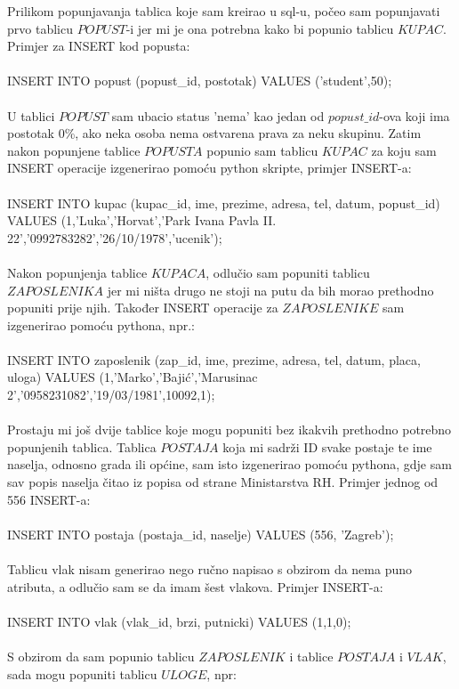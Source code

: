 \documentclass{OM_style}
\begin{document}
Prilikom popunjavanja tablica koje sam kreirao u sql-u, počeo sam popunjavati prvo tablicu $POPUST$-i jer mi je ona potrebna kako bi popunio tablicu $KUPAC$. Primjer za INSERT kod popusta: \\
\\
INSERT INTO popust (popust\_id, postotak) VALUES ('student',50); \\
\\
U tablici $POPUST$ sam ubacio status 'nema' kao jedan od $popust\_id$-ova koji ima postotak 0\%, ako neka osoba nema ostvarena prava za neku skupinu. Zatim nakon popunjene tablice $POPUSTA$ popunio sam tablicu $KUPAC$ za koju sam INSERT operacije izgenerirao pomoću python skripte, primjer INSERT-a:\\
\\
INSERT INTO kupac (kupac\_id, ime, prezime, adresa, tel, datum, popust\_id) VALUES (1,'Luka','Horvat','Park Ivana Pavla II. 22','0992783282','26/10/1978','ucenik'); \\
\\
Nakon popunjenja tablice $KUPACA$, odlučio sam popuniti tablicu $ZAPOSLENIKA$ jer mi ništa drugo ne stoji na putu da bih morao prethodno popuniti prije njih. Također INSERT operacije za $ZAPOSLENIKE$ sam izgenerirao pomoću pythona, npr.:\\
\\
INSERT INTO zaposlenik (zap\_id, ime, prezime, adresa, tel, datum, placa, uloga) VALUES (1,'Marko','Bajić','Marusinac 2','0958231082','19/03/1981',10092,1);\\
\\
Prostaju mi još dvije tablice koje mogu popuniti bez ikakvih prethodno potrebno popunjenih tablica. Tablica $POSTAJA$ koja mi sadrži ID svake postaje te ime naselja, odnosno grada ili općine, sam isto izgenerirao pomoću pythona, gdje sam sav popis naselja čitao iz popisa od strane Ministarstva RH. Primjer jednog od 556 INSERT-a: \\
\\
INSERT INTO postaja (postaja\_id, naselje) VALUES (556, 'Zagreb'); \\
\\
Tablicu vlak nisam generirao nego ručno napisao s obzirom da nema puno atributa, a odlučio sam se da imam šest vlakova. Primjer INSERT-a: \\
\\
INSERT INTO vlak (vlak\_id, brzi, putnicki) VALUES (1,1,0); \\
\\
S obzirom da sam popunio tablicu $ZAPOSLENIK$ i tablice $POSTAJA$ i $VLAK$, sada mogu popuniti tablicu $ULOGE$, npr:\\
\end{document}
